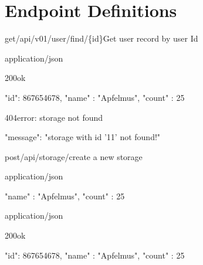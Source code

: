\documentclass{article}
\begin{document}
\section{Endpoint Definitions}
\begin{apiRoute}{get}{/api/v01/user/find/\{id\}}{Get user record by user Id}
	
	\begin{routeParameter}
	\end{routeParameter}
	\begin{routeResponse}{application/json}
		\begin{routeResponseItem}{200}{ok}
			\begin{routeResponseItemBody}
{     
	"id": 867654678,
	"name" : "Apfelmus",
	"count" : 25
}
			\end{routeResponseItemBody}
		\end{routeResponseItem}
		\begin{routeResponseItem}{404}{error: storage not found}
			\begin{routeResponseItemBody}
{
	"message": "storage with id '11' not found!"
}
			\end{routeResponseItemBody}
		\end{routeResponseItem}
	\end{routeResponse}
	
\end{apiRoute}



\begin{apiRoute}{post}{/api/storage/}{create a new storage}
	\begin{routeParameter}
		\noRouteParameter{no parameter}
	\end{routeParameter}
	\begin{routeRequest}{application/json}
		\begin{routeRequestBody}
{
	"name" : "Apfelmus",
	"count" : 25
}
		\end{routeRequestBody}
	\end{routeRequest}
	\begin{routeResponse}{application/json}
		\begin{routeResponseItem}{200}{ok}
			\begin{routeResponseItemBody}
{     
	"id": 867654678,
	"name" : "Apfelmus",
	"count" : 25
}
			\end{routeResponseItemBody}
		\end{routeResponseItem}
	\end{routeResponse}
\end{apiRoute}
\end{document}
